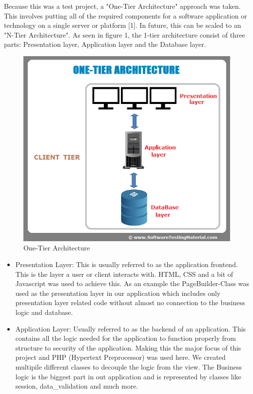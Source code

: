\documentclass[12pt,a4paper]{article}
\begin{document}
\begin{flushleft}
	Because this was a test project, a "One-Tier Architecture" approach was taken. This involves putting all of the required components for a software application or technology on a single server or platform [1]. In future, this can be scaled to an "N-Tier Architecture".  As seen in figure 1, the 1-tier architecture consist of three parts: Presentation layer, Application layer and the Database layer.    
	\begin{figure}[h]
			\begin{center}
				\includegraphics[scale = 0.3]{one-tier-software-architecture}
			
			\caption{One-Tier Architecture}
			
			\end{center}
		\end{figure}
		
	\begin{itemize}
		\item 	Presentation Layer: This is usually referred to as the application frontend. This is the layer a user or client interacts with. HTML, CSS and a bit of Javascript was used to achieve this. As an example the PageBuilder-Class was used as the presentation layer in our application which includes only presentation layer related code without almost no connection to the business logic and database.
		
		\item Application Layer: Usually referred to as the backend of an application. This contains all the logic needed for the application to function properly from structure to security of the application. Making this the major focus of this project and PHP (Hypertext Preprocessor) was used here.  We created multipile different classes to decouple the logic from the view.  The Business logic is the biggest part in out application and is represented by classes like session, data\_validation and much more.
		

\end{itemize}
\end{flushleft}
\end{document}
